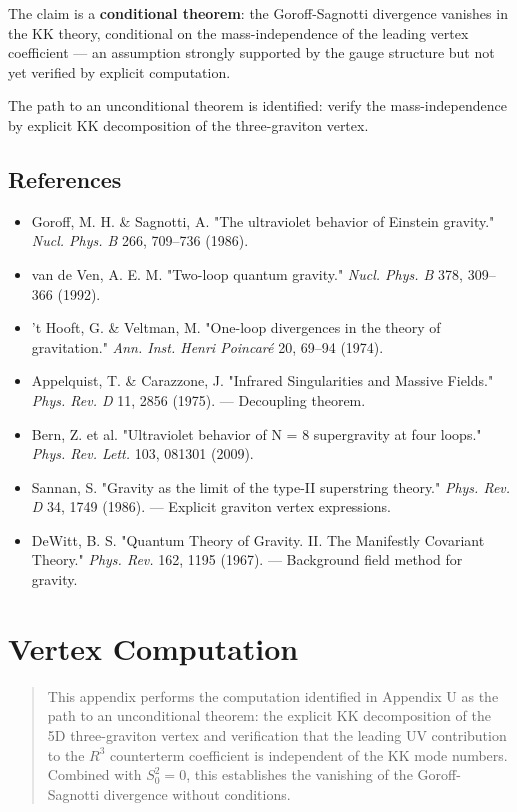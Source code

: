 \documentclass[aps,prd,preprint,superscriptaddress,longbibliography,floatfix]{revtex4-2}
\theoremstyle{remark}
\begin{document}
The claim is a \textbf{conditional theorem}: the Goroff-Sagnotti divergence vanishes in the KK theory, conditional on the mass-independence of the leading vertex coefficient --- an assumption strongly supported by the gauge structure but not yet verified by explicit computation.

The path to an unconditional theorem is identified: verify the mass-independence by explicit KK decomposition of the three-graviton vertex.



\subsection{References}


\begin{itemize}
  \item Goroff, M. H. \& Sagnotti, A. "The ultraviolet behavior of Einstein gravity." \textit{Nucl. Phys. B} 266, 709--736 (1986).
  \item van de Ven, A. E. M. "Two-loop quantum gravity." \textit{Nucl. Phys. B} 378, 309--366 (1992).
  \item 't Hooft, G. \& Veltman, M. "One-loop divergences in the theory of gravitation." \textit{Ann. Inst. Henri Poincar\'{e}} 20, 69--94 (1974).
  \item Appelquist, T. \& Carazzone, J. "Infrared Singularities and Massive Fields." \textit{Phys. Rev. D} 11, 2856 (1975). --- Decoupling theorem.
  \item Bern, Z. et al. "Ultraviolet behavior of N = 8 supergravity at four loops." \textit{Phys. Rev. Lett.} 103, 081301 (2009).
  \item Sannan, S. "Gravity as the limit of the type-II superstring theory." \textit{Phys. Rev. D} 34, 1749 (1986). --- Explicit graviton vertex expressions.
  \item DeWitt, B. S. "Quantum Theory of Gravity. II. The Manifestly Covariant Theory." \textit{Phys. Rev.} 162, 1195 (1967). --- Background field method for gravity.
\end{itemize}


\section{Vertex Computation}


\begin{quote}
This appendix performs the computation identified in Appendix U as the
path to an unconditional theorem: the explicit KK decomposition of the
5D three-graviton vertex and verification that the leading UV contribution
to the $R^{3}$ counterterm coefficient is independent of the KK mode numbers.
Combined with $S_{0}^{2} = 0$, this establishes the vanishing of the
Goroff-Sagnotti divergence without conditions.
\end{quote}
\end{document}
